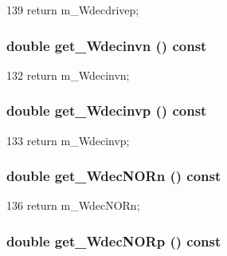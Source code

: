 \begin{DoxyCode}
139 { return m_Wdecdrivep; }
\end{DoxyCode}
\hypertarget{classTechParameter_a9e908dc77e54b76dadc9d8d85afb2644}{
\subsubsection[{get\_\-Wdecinvn}]{\setlength{\rightskip}{0pt plus 5cm}double get\_\-Wdecinvn () const}}
\label{classTechParameter_a9e908dc77e54b76dadc9d8d85afb2644}



\begin{DoxyCode}
132 { return m_Wdecinvn; }
\end{DoxyCode}
\hypertarget{classTechParameter_af1bceed7662500febd833e6ae3a0ddac}{
\subsubsection[{get\_\-Wdecinvp}]{\setlength{\rightskip}{0pt plus 5cm}double get\_\-Wdecinvp () const}}
\label{classTechParameter_af1bceed7662500febd833e6ae3a0ddac}



\begin{DoxyCode}
133 { return m_Wdecinvp; }
\end{DoxyCode}
\hypertarget{classTechParameter_a9453c95155403fcab792b60e8f1e61fe}{
\subsubsection[{get\_\-WdecNORn}]{\setlength{\rightskip}{0pt plus 5cm}double get\_\-WdecNORn () const}}
\label{classTechParameter_a9453c95155403fcab792b60e8f1e61fe}



\begin{DoxyCode}
136 { return m_WdecNORn; }
\end{DoxyCode}
\hypertarget{classTechParameter_aa9e8806878c45b3d37eb1296d77edb89}{
\subsubsection[{get\_\-WdecNORp}]{\setlength{\rightskip}{0pt plus 5cm}double get\_\-WdecNORp () const}}
\label{classTechParameter_aa9e8806878c45b3d37eb1296d77edb89}




